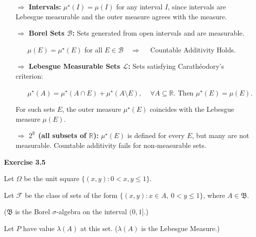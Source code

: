    \vspace{-1ex}
    \begin{itemize}
      \setlength\itemsep{0.25em}
      \item[$\Rightarrow$] \textbf{Intervals:} $\mu^\star(I) = \mu(I)$ for any interval $I$, since intervals are Lebesgue measurable and the outer measure agrees with the measure.
      
      \item[$\Rightarrow$] \textbf{Borel Sets $\mathcal{B}$:} Sets generated from open intervals and are measurable.
        \begin{itemize}[nosep]
        \item[] $\mu(E) = \mu^\star(E)$ for all $E \in \mathcal{B} \quad \Rightarrow \quad$ Countable Additivity Holds.
      \end{itemize}
    
      \item[$\Rightarrow$] \textbf{Lebesgue Measurable Sets $\mathcal{L}$:} Sets satisfying Carathéodory’s criterion:
        \begin{itemize}[nosep]
            \item[] \quad $\mu^\star(A) = \mu^\star(A \cap E) + \mu^\star(A \setminus E), \,\quad \forall A \subseteq \mathbb{R}$. Then $\mu^\star(E) = \mu(E)$.
        \end{itemize}
        \phantom{aa}For such sets $E$, the outer measure $\mu^\star(E)$ coincides with the Lebesgue\\
        \phantom{aa}measure $\mu(E)$.
      \item[$\Rightarrow$] \textbf{$2^{\mathbb{R}}$ (all subsets of $\mathbb{R}$):} $\mu^\star(E)$ is defined for every $E$, but many are not measurable. Countable additivity fails for non-measurable sets.
    \end{itemize}

    \newpage
    
    
     \hfill \textbf{\scriptsize Exercise 3.5}

    Let \(\Omega\) be the unit square \(\{(x, y) : 0 < x, y \leq 1\}\).

Let \(\mathcal{F}\) be the class of sets of the form
\(\{(x, y) : x \in A,\ 0 < y \leq 1\}\), where \(A \in \mathfrak{B}\).

\phantom{Let }\elbowarrow (\(\mathfrak{B}\) is the Borel
\(\sigma\)-algebra on the interval \((0,1]\).)

Let \(P\) have value \(\lambda(A)\) at this set. (\(\lambda(A)\) is the
Lebesgue Measure.)

